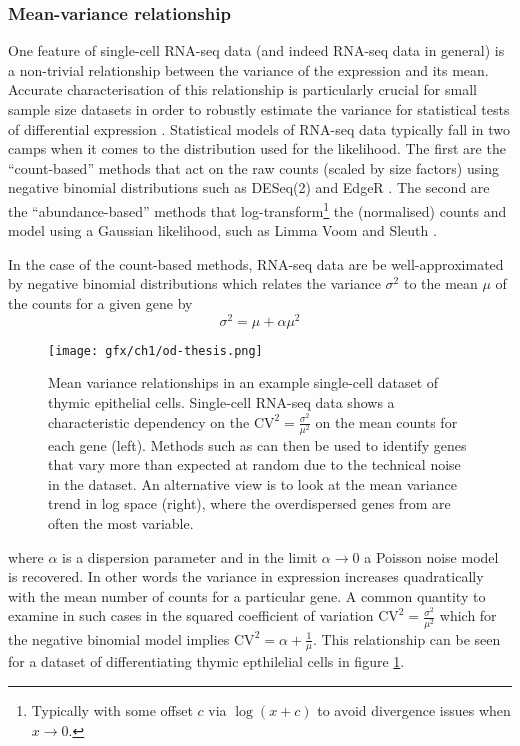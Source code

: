\subsubsection{Mean-variance relationship}

One feature of single-cell RNA-seq data (and indeed RNA-seq data in general) is a non-trivial relationship between the variance of the expression and its mean. Accurate characterisation of this relationship is particularly crucial for small sample size datasets in order to robustly estimate the variance for statistical tests of differential expression \cite{Robinson2010-rj}. Statistical models of RNA-seq data typically fall in two camps when it comes to the distribution used for the likelihood. The first are the ``count-based'' methods  that act on the raw counts (scaled by size factors) using negative binomial distributions such as DESeq(2) and EdgeR \cite{Anders2010,Robinson2010-rj}. The second are the ``abundance-based'' methods  that log-transform\footnote{
Typically with some offset $c$ via $\log(x+c)$ to avoid divergence issues when $x \rightarrow 0$.
} the (normalised) counts and model using a Gaussian likelihood, such as Limma Voom and Sleuth \cite{Law2014-tu,Pimentel2016-xz}.

In the case of the count-based methods, RNA-seq data are  be well-approximated by negative binomial distributions \cite{Anders2010,Robinson2010-rj,Risso2017-qk} which relates the variance $\sigma^2$ to the mean $\mu$ of the counts for a given gene by
\begin{equation}
  \sigma^2 = \mu + \alpha \mu^2
\end{equation}

\begin{figure}
\centering
  \texttt{[image: gfx/ch1/od-thesis.png]}
  \caption[Mean-variance relationships in an example single-cell dataset.]{Mean variance relationships in an example single-cell dataset of thymic epithelial cells. Single-cell RNA-seq data shows a characteristic dependency on the $\text{CV}^2 = \frac{\sigma^2}
{\mu^2}$ on the mean counts for each gene (left). Methods such as \cite{Brennecke2013-xy} can then be used to identify genes that vary more than expected at random due to the technical noise in the dataset. An alternative view is to look at the mean variance trend in log space (right), where the overdispersed genes from \cite{Brennecke2013-xy} are often the most variable.} \label{fig:od}
\end{figure}


where $\alpha$ is a dispersion parameter and in the limit $\alpha \rightarrow 0$ a Poisson noise model is recovered. In other words the variance in expression increases quadratically with the mean number of counts for a particular gene. A common quantity to examine in such cases in the squared coefficient of variation $\text{CV}^2 = \frac{\sigma^2}{\mu^2}$ which for the negative binomial model implies $\text{CV}^2 = \alpha + \frac{1}{\mu}$. This relationship can be seen for a dataset of differentiating thymic epthilelial cells in figure \ref{fig:od}.

